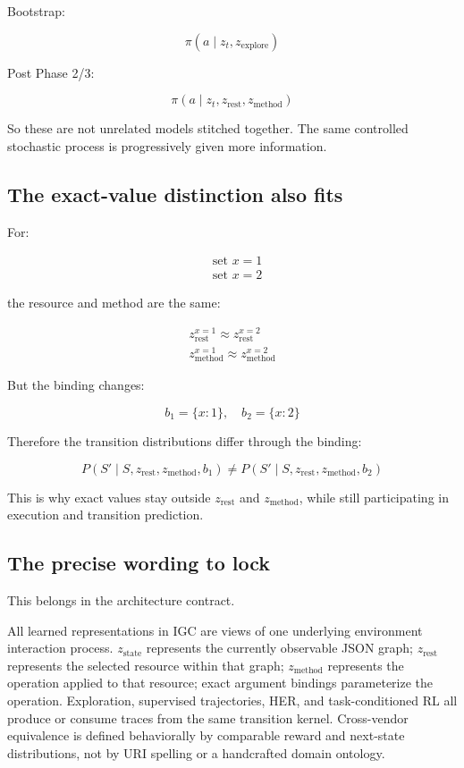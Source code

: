\documentclass{article}
\begin{document}
Bootstrap:

$$
\pi\left(a \mid z_t, z_{\text{explore}}\right)
$$

Post Phase 2/3:

$$
\pi\left(a \mid z_t, z_{\text{rest}}, z_{\text{method}}\right)
$$

So these are not unrelated models stitched together. The same controlled stochastic process is progressively given more information.

\subsection*{The exact-value distinction also fits}

For:

$$
\begin{aligned}
  & \text{set } x = 1 \\
  & \text{set } x = 2
\end{aligned}
$$

the resource and method are the same:

$$
\begin{gathered}
  z_{\text{rest}}^{x=1} \approx z_{\text{rest}}^{x=2} \\
  z_{\text{method}}^{x=1} \approx z_{\text{method}}^{x=2}
\end{gathered}
$$

But the binding changes:

$$
b_1 = \{x: 1\}, \quad b_2 = \{x: 2\}
$$

Therefore the transition distributions differ through the binding:

$$
P\left(S' \mid S, z_{\text{rest}}, z_{\text{method}}, b_1\right) \neq P\left(S' \mid S, z_{\text{rest}}, z_{\text{method}}, b_2\right)
$$

This is why exact values stay outside $z_{\text{rest}}$ and $z_{\text{method}}$, while still participating in execution and transition prediction.

\subsection*{The precise wording to lock}

This belongs in the architecture contract.

All learned representations in IGC are views of one underlying environment interaction process. $z_{\text{state}}$ represents the currently observable JSON graph; $z_{\text{rest}}$ represents the selected resource within that graph; $z_{\text{method}}$ represents the operation applied to that resource; exact argument bindings parameterize the operation. Exploration, supervised trajectories, HER, and task-conditioned RL all produce or consume traces from the same transition kernel. Cross-vendor equivalence is defined behaviorally by comparable reward and next-state distributions, not by URI spelling or a handcrafted domain ontology.
\end{document}
